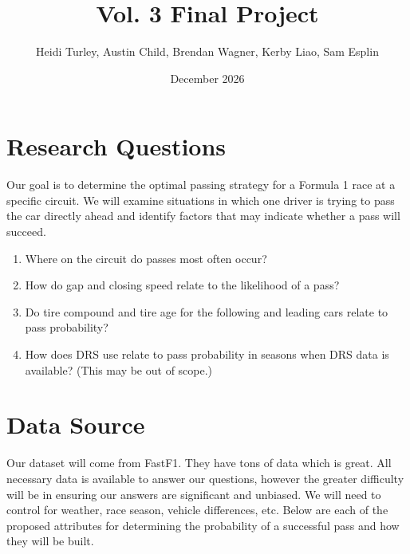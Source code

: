 \documentclass{article}
\title{Vol. 3 Final Project}
\author{Heidi Turley, Austin Child, Brendan Wagner, Kerby Liao, Sam Esplin}
\date{December 2026}
\begin{document}
\maketitle

\section{Research Questions}

Our goal is to determine the optimal passing strategy for a Formula 1 race
at a specific circuit. We will examine situations in which one driver is
trying to pass the car directly ahead and identify factors that may indicate
whether a pass will succeed.

\begin{enumerate}[itemsep=0.25em]
    \item Where on the circuit do passes most often occur?
    \item How do gap and closing speed relate to the likelihood of a pass?
    \item Do tire compound and tire age for the following and leading cars
          relate to pass probability?
    \item How does DRS use relate to pass probability in seasons when DRS
          data is available? (This may be out of scope.)
\end{enumerate}

\section{Data Source}
Our dataset will come from FastF1. They have tons of data which is great. All necessary data is available to answer our questions, however the greater difficulty will be in ensuring our answers are significant and unbiased. We will need to control for weather, race season, vehicle differences, etc. Below are each of the proposed attributes for determining the probability of a successful pass and how they will be built.
\end{document}
